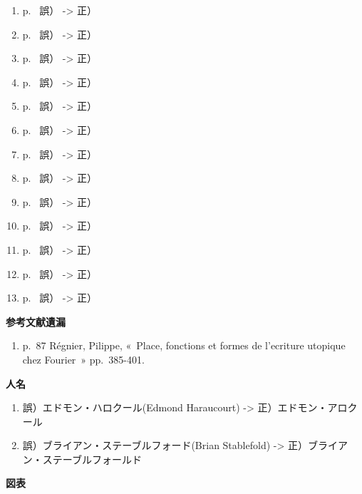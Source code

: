 \begin{enumerate}
  \item p.~ 誤） -> 正）
  \item p.~ 誤） -> 正）
  \item p.~ 誤） -> 正）
  \item p.~ 誤） -> 正）
  \item p.~ 誤） -> 正）
  \item p.~ 誤） -> 正）
  \item p.~ 誤） -> 正）
  \item p.~ 誤） -> 正）
  \item p.~ 誤） -> 正）
  \item p.~ 誤） -> 正）
  \item p.~ 誤） -> 正）
  \item p.~ 誤） -> 正）
  \item p.~ 誤） -> 正）

\end{enumerate}
\textbf{参考文献遺漏}
\begin{enumerate}
  \item p.~87 Régnier, Pilippe, «~Place, fonctions et formes de l'ecriture utopique chez Fourier~» pp.~385-401.
\end{enumerate}
\textbf{人名}
\begin{enumerate}
  \item 誤）エドモン・ハロクール(Edmond Haraucourt) -> 正）エドモン・アロクール
  \item 誤）ブライアン・ステーブルフォード(Brian Stablefold) -> 正）ブライアン・ステーブルフォールド
\end{enumerate}
\textbf{図表}
